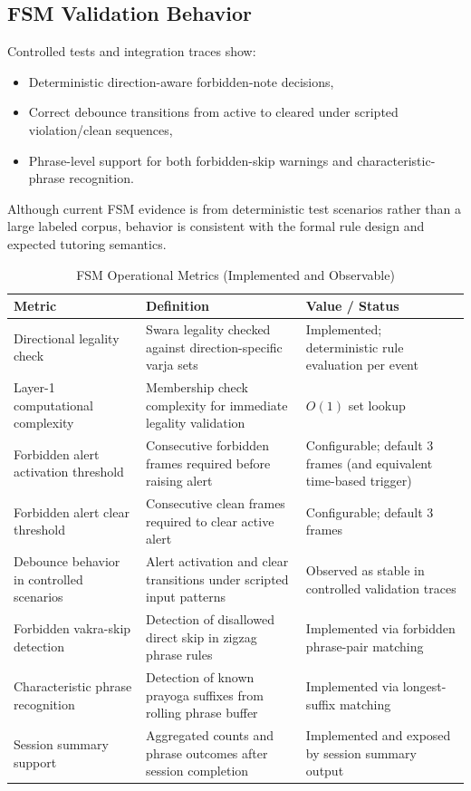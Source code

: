 \documentclass{ieeeaccess}
\begin{document}
\subsection{FSM Validation Behavior}
Controlled tests and integration traces show:
\begin{itemize}
\item Deterministic direction-aware forbidden-note decisions,
\item Correct debounce transitions from active to cleared under scripted violation/clean sequences,
\item Phrase-level support for both forbidden-skip warnings and characteristic-phrase recognition.
\end{itemize}

Although current FSM evidence is from deterministic test scenarios rather than a large labeled corpus, behavior is consistent with the formal rule design and expected tutoring semantics.

\FloatBarrier
\begin{table}[ht]
\caption{FSM Operational Metrics (Implemented and Observable)}
\label{tab:fsm_operational_metrics}
\centering
\setlength{\tabcolsep}{3pt}
\begin{tabular}{p{2.3cm}p{3cm}p{2.5cm}}
\toprule
Metric & Definition & Value / Status \\
\midrule
Directional legality check & Swara legality checked against direction-specific varja sets & Implemented; deterministic rule evaluation per event \\
Layer-1 computational complexity & Membership check complexity for immediate legality validation & $O(1)$ set lookup \\
Forbidden alert activation threshold & Consecutive forbidden frames required before raising alert & Configurable; default 3 frames (and equivalent time-based trigger) \\
Forbidden alert clear threshold & Consecutive clean frames required to clear active alert & Configurable; default 3 frames \\
Debounce behavior in controlled scenarios & Alert activation and clear transitions under scripted input patterns & Observed as stable in controlled validation traces \\
Forbidden vakra-skip detection & Detection of disallowed direct skip in zigzag phrase rules & Implemented via forbidden phrase-pair matching \\
Characteristic phrase recognition & Detection of known prayoga suffixes from rolling phrase buffer & Implemented via longest-suffix matching \\
Session summary support & Aggregated counts and phrase outcomes after session completion & Implemented and exposed by session summary output \\
\bottomrule
\end{tabular}
\end{table}
\vspace{14pt}
\FloatBarrier
\end{document}
